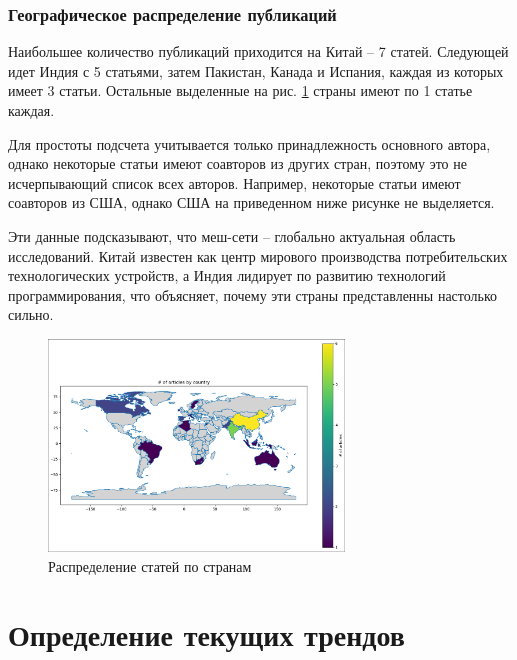 \documentclass[%
]{report}
\begin{document}
\subsubsection{Географическое распределение публикаций}\label{geographical-distribution-of-publications}

Наибольшее количество публикаций приходится на Китай -- 7 статей.
Следующей идет Индия с 5 статьями,
затем Пакистан, Канада и Испания,
каждая из которых имеет 3 статьи.
Остальные выделенные на рис. \ref{pic:country} страны имеют по 1 статье каждая.

Для простоты подсчета учитывается только принадлежность
основного автора, однако некоторые статьи
имеют соавторов из других стран,
поэтому это не исчерпывающий список всех авторов.
Например, некоторые статьи имеют соавторов из США,
однако США на приведенном ниже рисунке не выделяется.

Эти данные подсказывают, что
меш-сети -- глобально актуальная область исследований.
Китай известен как центр мирового производства
потребительских технологических устройств,
а Индия лидирует по развитию технологий программирования,
что объясняет, почему эти страны представленны настолько сильно.

\begin{figure}[p]
\centering
\includegraphics[width=0.7\textwidth]{./assets/by-country.png}
\caption{Распределение статей по странам}
\label{pic:country}
\end{figure}

\section{Определение текущих трендов}\label{defining-current-trends}
\end{document}
